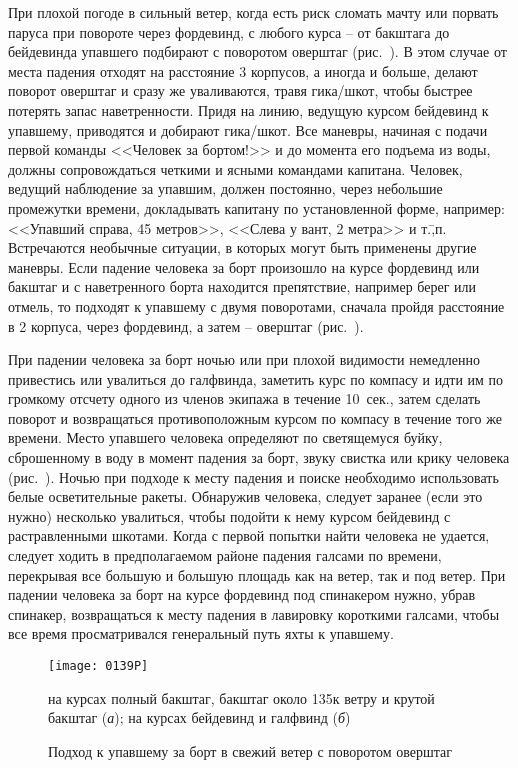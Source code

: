 При плохой погоде в сильный ветер, когда есть риск сломать мачту или порвать паруса при повороте через фордевинд, с любого курса \--- от бакштага до бейдевинда упавшего подбирают с поворотом оверштаг (рис.~). В этом случае от места падения отходят на расстояние 3 корпусов, а иногда и больше, делают поворот оверштаг и сразу же уваливаются, травя гика\-/шкот, чтобы быстрее потерять запас наветренности. Придя на линию, ведущую курсом бейдевинд к упавшему, приводятся и добирают гика\-/шкот. Все маневры, начиная с подачи первой команды <<Человек за бортом!>> и до момента его подъема из воды, должны сопровождаться четкими и ясными командами капитана. Человек, ведущий наблюдение за упавшим, должен постоянно, через небольшие промежутки времени, докладывать капитану по установленной форме, например: <<Упавший справа, 45 метров>>, <<Слева у вант, 2 метра>> и т.\=,п. Встречаются необычные ситуации, в которых могут быть применены другие маневры. Если падение человека за борт произошло на курсе фордевинд или бакштаг и с наветренного борта находится препятствие, например берег или отмель, то подходят к упавшему с двумя поворотами, сначала пройдя расстояние в 2 корпуса, через фордевинд, а затем \--- оверштаг (рис.~).

При падении человека за борт ночью или при плохой видимости немедленно привестись или увалиться до галфвинда, заметить курс по компасу и идти им по громкому отсчету одного из членов экипажа в течение 10~сек., затем сделать поворот и возвращаться противоположным курсом по компасу в течение того же времени. Место упавшего человека определяют по светящемуся буйку, сброшенному в воду в момент падения за борт, звуку свистка или крику человека (рис.~). Ночью при подходе к месту падения и поиске необходимо использовать белые осветительные ракеты. Обнаружив человека, следует заранее (если это нужно) несколько увалиться, чтобы подойти к нему курсом бейдевинд с растравленными шкотами. Когда с первой попытки найти человека не удается, следует ходить в предполагаемом районе падения галсами по времени, перекрывая все большую и большую площадь как на ветер, так и под ветер. При падении человека за борт на курсе фордевинд под спинакером нужно, убрав спинакер, возвращаться к месту падения в лавировку короткими галсами, чтобы все время просматривался генеральный путь яхты к упавшему.

\begin{figure*}[htb]
  \centering{}
  \texttt{[image: 0139P]}
  \caption{Подход к упавшему за борт в свежий ветер с поворотом оверштаг}
  \label{fig:139}
  \small
  \centering{}
  на курсах полный бакштаг, бакштаг около 135\gr к ветру и крутой бакштаг (\textit{а}); на курсах бейдевинд и галфвинд (\textit{б})
\end{figure*}

